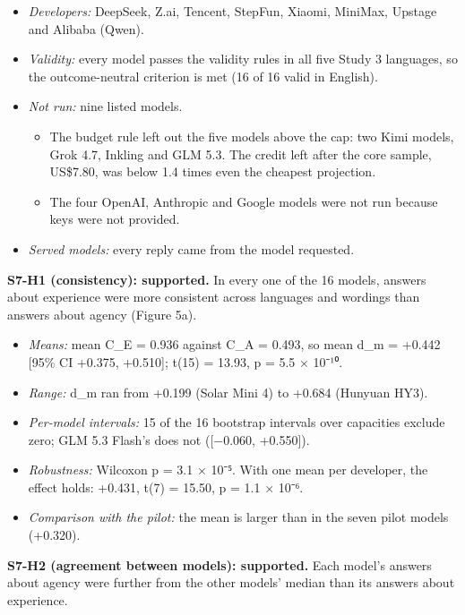 \documentclass[
  11pt,
]{article}
\providecommand{\tightlist}{%
  \setlength{\itemsep}{0pt}\setlength{\parskip}{0pt}}
\begin{document}
\begin{itemize}
\tightlist
\item
  \emph{Developers:} DeepSeek, Z.ai, Tencent, StepFun, Xiaomi, MiniMax,
  Upstage and Alibaba (Qwen).
\item
  \emph{Validity:} every model passes the validity rules in all five
  Study 3 languages, so the outcome-neutral criterion is met (16 of 16
  valid in English).
\item
  \emph{Not run:} nine listed models.

  \begin{itemize}
  \tightlist
  \item
    The budget rule left out the five models above the cap: two Kimi
    models, Grok 4.7, Inkling and GLM 5.3. The credit left after the
    core sample, US\$7.80, was below 1.4 times even the cheapest
    projection.
  \item
    The four OpenAI, Anthropic and Google models were not run because
    keys were not provided.
  \end{itemize}
\item
  \emph{Served models:} every reply came from the model requested.
\end{itemize}

\textbf{S7-H1 (consistency): supported.} In every one of the 16 models,
answers about experience were more consistent across languages and
wordings than answers about agency (Figure 5a).

\begin{itemize}
\tightlist
\item
  \emph{Means:} mean C\_E = 0.936 against C\_A = 0.493, so mean d\_m =
  +0.442 {[}95\% CI +0.375, +0.510{]}; t(15) = 13.93, p = 5.5 × 10⁻¹⁰.
\item
  \emph{Range:} d\_m ran from +0.199 (Solar Mini 4) to +0.684 (Hunyuan
  HY3).
\item
  \emph{Per-model intervals:} 15 of the 16 bootstrap intervals over
  capacities exclude zero; GLM 5.3 Flash's does not ({[}−0.060,
  +0.550{]}).
\item
  \emph{Robustness:} Wilcoxon p = 3.1 × 10⁻⁵. With one mean per
  developer, the effect holds: +0.431, t(7) = 15.50, p = 1.1 × 10⁻⁶.
\item
  \emph{Comparison with the pilot:} the mean is larger than in the seven
  pilot models (+0.320).
\end{itemize}

\textbf{S7-H2 (agreement between models): supported.} Each model's
answers about agency were further from the other models' median than its
answers about experience.
\end{document}

